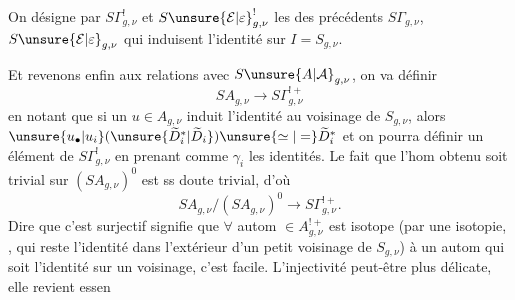 
On désigne par $S\Gamma^{!}_{g,\nu}$ et $S\unsure{\mathcal{E}|\varepsilon}^{!}_{g,\nu}$ les  des précédents $S\Gamma_{g,\nu}$, $S\unsure{\mathcal{E}|\varepsilon}_{g,\nu}$ qui induisent l'identité sur $I=S_{g,\nu}$.

Et revenons enfin aux relations avec $S\unsure{A|\mathcal A}_{g,\nu}$, on va définir
\[
SA_{g,\nu}\longrightarrow S\Gamma^{!+}_{g,\nu}
\]
en  notant que si un $u\in A_{g,\nu}$ induit l'identité au voisinage de $S_{g,\nu}$, alors $\unsure{u_{\bullet}|u_i}(\unsure{\widetilde D_i^{*}|\widetilde D_i})\unsure{\simeq|=}\widetilde D_i^{*}$ et on pourra définir un élément de $S\Gamma^{!}_{g,\nu}$ en prenant comme $\gamma_i$ les identités. Le fait que l'hom obtenu soit trivial sur $(SA_{g,\nu})^0$ est ss doute trivial, d'où
\[
SA_{g,\nu}/(SA_{g,\nu})^0\longrightarrow S\Gamma^{!+}_{g,\nu}.
\]
Dire que c'est surjectif signifie que $\forall$ autom $\in A_{g,\nu}^{!+}$  est isotope (par une isotopie, , qui reste l'identité dans l'extérieur d'un petit voisinage de $S_{g,\nu}$) à un autom qui soit l'identité sur un voisinage, c'est facile. L'injectivité peut-être plus délicate, elle revient essen



